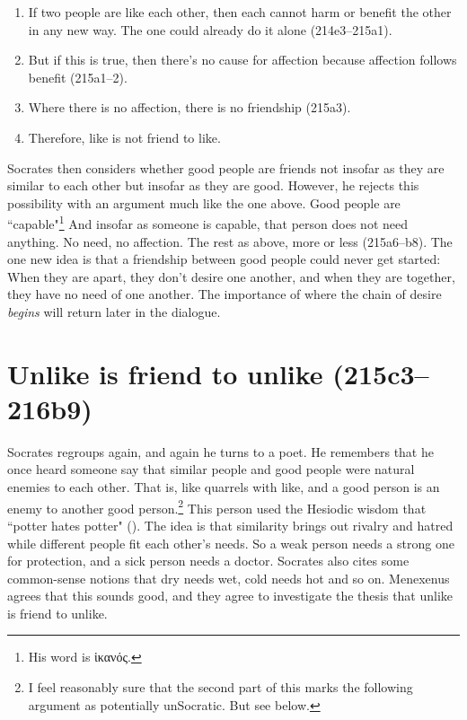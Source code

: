 \documentclass[11pt]{article}
\begin{document}
\begin{enumerate}
    \item If two people are like each other, then each cannot harm or benefit the other in any new way.  The one could already do it alone (214e3--215a1).
    \item But if this is true, then there's no cause for affection because affection follows benefit (215a1--2).
    \item Where there is no affection, there is no friendship (215a3).
    \item Therefore, like is not friend to like.
\end{enumerate}

Socrates then considers whether good people are friends not insofar as they are similar to each other but insofar as they are good.  However, he rejects this possibility with an argument much like the one above.  Good people are ``capable"\footnote{His word is ἱκανός.}  And insofar as someone is capable, that person does not need anything.  No need, no affection.  The rest as above, more or less (215a6--b8).  The one new idea is that a friendship between good people could never get started: When they are apart, they don't desire one another, and when they are together, they have no need of one another.  The importance of where the chain of desire \emph{begins} will return later in the dialogue.

\section{Unlike is friend to unlike (215c3--216b9)}

Socrates regroups again, and again he turns to a poet.  He remembers that he once heard someone say that similar people and good people were natural enemies to each other.  That is, like quarrels with like, and a good person is an enemy to another good person.\footnote{I feel reasonably sure that the second part of this marks the following argument as potentially unSocratic.  But see below.}  This person used the Hesiodic wisdom that ``potter hates potter" ().  The idea is that similarity brings out rivalry and hatred while different people fit each other's needs.  So a weak person needs a strong one for protection, and a sick person needs a doctor.  Socrates also cites some common-sense notions that dry needs wet, cold needs hot and so on.  Menexenus agrees that this sounds good, and they agree to investigate the thesis that unlike is friend to unlike.
\end{document}
